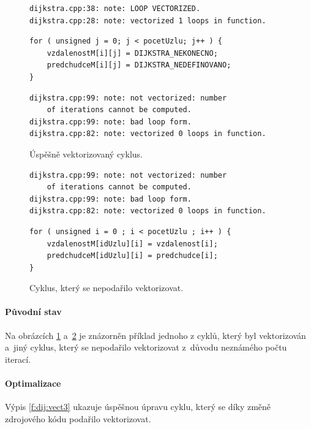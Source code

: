 \begin{figure}
    \centering
	\caption{Úspěšně vektorizovaný cyklus.}
	\label{f:dij:vect1}
    \begin{lstlisting}
dijkstra.cpp:38: note: LOOP VECTORIZED.
dijkstra.cpp:28: note: vectorized 1 loops in function.
    \end{lstlisting}
	\begin{lstlisting}
for ( unsigned j = 0; j < pocetUzlu; j++ ) {
	vzdalenostM[i][j] = DIJKSTRA_NEKONECNO;
	predchudceM[i][j] = DIJKSTRA_NEDEFINOVANO;
}
    \end{lstlisting}
    
    \begin{lstlisting}
dijkstra.cpp:99: note: not vectorized: number
    of iterations cannot be computed.
dijkstra.cpp:99: note: bad loop form.
dijkstra.cpp:82: note: vectorized 0 loops in function.
    \end{lstlisting}
\end{figure}
\begin{figure}
    \centering
    \caption{Cyklus, který se nepodařilo vektorizovat.}
	\label{f:dij:vect2}
    \begin{lstlisting}
dijkstra.cpp:99: note: not vectorized: number
    of iterations cannot be computed.
dijkstra.cpp:99: note: bad loop form.
dijkstra.cpp:82: note: vectorized 0 loops in function.
    \end{lstlisting}
    
	\begin{lstlisting}
for ( unsigned i = 0 ; i < pocetUzlu ; i++ ) {
	vzdalenostM[idUzlu][i] = vzdalenost[i];
	predchudceM[idUzlu][i] = predchudce[i];
}
	\end{lstlisting}
\end{figure}

\paragraph{Původní stav}
Na obrázcích \ref{f:dij:vect1} a~\ref{f:dij:vect2} je znázorněn příklad jednoho z cyklů, který byl vektorizován a~jiný cyklus, který se nepodařilo vektorizovat z~dů\-vo\-du neznámého počtu iterací.

\paragraph{Optimalizace}
Výpis \ref{f:dij:vect3} ukazuje úspěšnou úpravu cyklu, který se díky změně zdrojového kódu podařilo vektorizovat.

